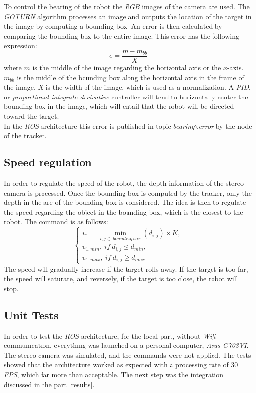 		To control the bearing of the robot the \textit{RGB} images 
		of the camera are used. The \textit{GOTURN} algorithm 
		processes an image and outputs the location of the 
		target in the image by computing a bounding box. An
		error is then calculated by comparing the bounding box
		to the entire image. This error  has the following expression:
		\[
			e = \frac{m - m_{bb}}{X}
		\]
		where $m$ is the middle of the image regarding the horizontal 
		axis or the $x$-axis. $m_{bb}$ is the middle of the bounding
		box along the horizontal axis in the frame of 
		the image. $X$ is the width of the image, which is used
		as a normalization. A \textit{PID}, or \textit{proportional
		integrate derivative} controller will tend
		to horizontally center the bounding box in the image, which 
		will entail that the robot will be directed toward 
		the target.
		\\\indent In the \textit{ROS} architecture this error
		is published in topic \textit{bearing$\backslash$error}
		by the node of the tracker.
		
		\subsection{Speed regulation}
		
		In order to regulate the speed of the robot, the depth 
		information of the stereo camera is processed. Once the 
		bounding box is computed by the tracker, only 
		the depth in the are of the bounding box is considered.
		The idea is then to regulate the speed regarding the object
		in the bounding box, which is the closest to the robot.
		The command is as follows:
		\[ \begin{cases}\label{key}
			u_1 = \min\limits_{i,j \in\ bounding\ box }(d_{i,j}) \times K,\\
			u_{1,min},\ if\ d_{i,j} \leq d_{min},\\
			u_{1,max},\ if\ d_{i,j} \geq d_{max}		
		\end{cases} \]
		The speed will gradually increase if the target rolls away.
		If the target is too far, the speed will saturate, and reversely, 
		if the target is too close, the robot will stop.
		
		\subsection{Unit Tests}\label{hardwaretests}
		
		In order to test the \textit{ROS} architecture, 
		for the local part, without \textit{Wifi} communication,
		everything was launched on a personal computer, \textit{Asus G703VI}.
		The stereo camera was simulated, and the commands were not 
		applied. The tests showed that the architecture
		worked as expected with a processing rate of 30 \textit{FPS},
		which far more than acceptable. The next step was the integration discussed
		in the part \vref{results}.
			

